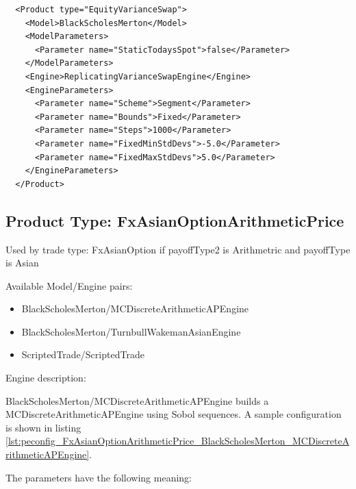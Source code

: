 \begin{listing}[ht]
\begin{verbatim}
  <Product type="EquityVarianceSwap">
    <Model>BlackScholesMerton</Model>
    <ModelParameters>
      <Parameter name="StaticTodaysSpot">false</Parameter>
    </ModelParameters>
    <Engine>ReplicatingVarianceSwapEngine</Engine>
    <EngineParameters>
      <Parameter name="Scheme">Segment</Parameter>
      <Parameter name="Bounds">Fixed</Parameter>
      <Parameter name="Steps">1000</Parameter>
      <Parameter name="FixedMinStdDevs">-5.0</Parameter>
      <Parameter name="FixedMaxStdDevs">5.0</Parameter>
    </EngineParameters>
  </Product>
\end{verbatim}
\caption{Configuration for Product EquityVarianceSwap, Model BlackScholesMerton, Engine ReplicatingVarianceSwapEngine,
  Alternative ``Robust'' variance swap pricing engine configuration using fixed integration bounds.}
\label{lst:peconfig_EquityVarianceSwap_BlackScholesMerton_ReplicatingVarianceSwapEngine_2}
\end{listing}

\subsection{Product Type: FxAsianOptionArithmeticPrice}

Used by trade type: FxAsianOption if payoffType2 is Arithmetric and payoffType is Asian

Available Model/Engine pairs:

\begin{itemize}
  \item BlackScholesMerton/MCDiscreteArithmeticAPEngine
  \item BlackScholesMerton/TurnbullWakemanAsianEngine
  \item ScriptedTrade/ScriptedTrade
\end{itemize}

Engine description:

BlackScholesMerton/MCDiscreteArithmeticAPEngine builds a MCDiscreteArithmeticAPEngine using Sobol sequences. A sample
configuration is shown in listing
\ref{lst:peconfig_FxAsianOptionArithmeticPrice_BlackScholesMerton_MCDiscreteArithmeticAPEngine}.

The parameters have the following meaning:

